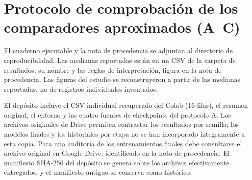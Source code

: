 \section{Protocolo de comprobaci\'on de los comparadores aproximados (A--C)}
\label{app:tanh_abc}

El cuaderno ejecutable y la nota de procedencia se adjuntan al
directorio de reproducibilidad. Las medianas reportadas est\'an
en un CSV de la carpeta de resultados; su nombre y las reglas
de interpretaci\'on, figura en la nota de procedencia. Las figuras
del estudio se reconstruyeron a partir de las medianas reportadas,
no de registros individuales inventados.

El depósito incluye el CSV individual recuperado del Colab (16 filas),
el resumen original, el entorno y las cuatro fuentes de checkpoints del
protocolo A. Los archivos originales de Drive permiten contrastar los
resultados por semilla; los modelos finales y los historiales por etapa
no se han incorporado íntegramente a esta copia. Para una auditoría de
los entrenamientos finales debe consultarse el archivo original en
Google Drive, identificado en la nota de procedencia. El manifiesto
SHA-256 del depósito se genera sobre los archivos efectivamente
entregados, y el manifiesto antiguo se conserva como histórico.
